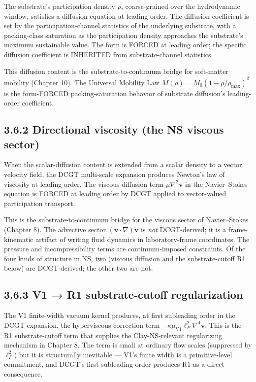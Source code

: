\documentclass[11pt]{book}
\begin{document}
The substrate's participation density $\rho$, coarse-grained over the hydrodynamic window, satisfies a diffusion equation at leading order. The diffusion coefficient is set by the participation-channel statistics of the underlying substrate, with a packing-class saturation as the participation density approaches the substrate's maximum sustainable value. The form is FORCED at leading order; the specific diffusion coefficient is INHERITED from substrate-channel statistics.

This diffusion content is the substrate-to-continuum bridge for soft-matter mobility (Chapter 10). The Universal Mobility Law $M(\rho) = M_0(1-\rho/\rho_\mathrm{max})^\beta$ is the form-FORCED packing-saturation behavior of substrate diffusion's leading-order coefficient.

\subsection{3.6.2 Directional viscosity (the NS viscous sector)}

When the scalar-diffusion content is extended from a scalar density to a vector velocity field, the DCGT multi-scale expansion produces Newton's law of viscosity at leading order. The viscous-diffusion term $\mu\nabla^2\mathbf{v}$ in the Navier–Stokes equation is FORCED at leading order by DCGT applied to vector-valued participation transport.

This is the substrate-to-continuum bridge for the viscous sector of Navier–Stokes (Chapter 8). The advective sector $(\mathbf{v}\cdot\nabla)\mathbf{v}$ is \textit{not} DCGT-derived; it is a frame-kinematic artifact of writing fluid dynamics in laboratory-frame coordinates. The pressure and incompressibility terms are continuum-imposed constraints. Of the four kinds of structure in NS, two (viscous diffusion and the substrate-cutoff R1 below) are DCGT-derived; the other two are not.

\subsection{3.6.3 V1 → R1 substrate-cutoff regularization}

The V1 finite-width vacuum kernel produces, at first subleading order in the DCGT expansion, the hyperviscous correction term $-\kappa\mu_\mathrm{V1}\ell_P^2 \nabla^4\mathbf{v}$. This is the R1 substrate-cutoff term that supplies the Clay-NS-relevant regularizing mechanism in Chapter 8. The term is small at ordinary flow scales (suppressed by $\ell_P^2$) but it is structurally inevitable — V1's finite width is a primitive-level commitment, and DCGT's first subleading order produces R1 as a direct consequence.
\end{document}
